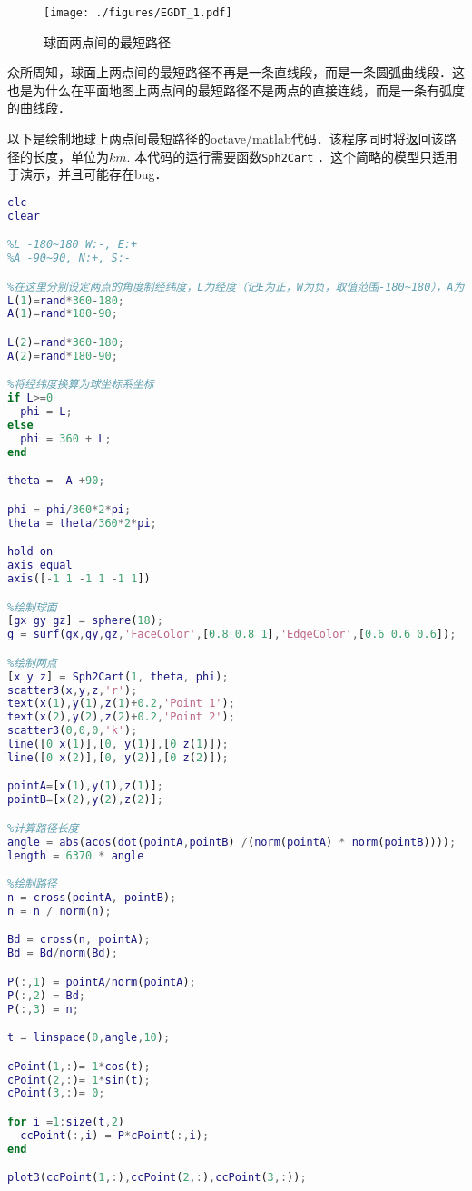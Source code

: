 \begin{figure}[ht]
\centering
\texttt{[image: ./figures/EGDT\_1.pdf]}
\caption{球面两点间的最短路径} \label{EGDT_fig1}
\end{figure}

众所周知，球面上两点间的最短路径不再是一条直线段，而是一条圆弧曲线段．这也是为什么在平面地图上两点间的最短路径不是两点的直接连线，而是一条有弧度的曲线段．

以下是绘制地球上两点间最短路径的octave/matlab代码．该程序同时将返回该路径的长度，单位为$km$. 本代码的运行需要函数\verb|Sph2Cart| ．这个简略的模型只适用于演示，并且可能存在bug．%

\begin{lstlisting}[language=matlab]
clc
clear

%L -180~180 W:-, E:+
%A -90~90, N:+, S:-

%在这里分别设定两点的角度制经纬度，L为经度（记E为正，W为负，取值范围-180~180），A为纬度（记N为正，S为负，取值范围-90~90）．
L(1)=rand*360-180;
A(1)=rand*180-90;

L(2)=rand*360-180;
A(2)=rand*180-90;

%将经纬度换算为球坐标系坐标
if L>=0
  phi = L;
else
  phi = 360 + L;
end

theta = -A +90;

phi = phi/360*2*pi;
theta = theta/360*2*pi;

hold on
axis equal
axis([-1 1 -1 1 -1 1])

%绘制球面
[gx gy gz] = sphere(18);
g = surf(gx,gy,gz,'FaceColor',[0.8 0.8 1],'EdgeColor',[0.6 0.6 0.6]);

%绘制两点
[x y z] = Sph2Cart(1, theta, phi);
scatter3(x,y,z,'r');
text(x(1),y(1),z(1)+0.2,'Point 1');
text(x(2),y(2),z(2)+0.2,'Point 2');
scatter3(0,0,0,'k');
line([0 x(1)],[0, y(1)],[0 z(1)]);
line([0 x(2)],[0, y(2)],[0 z(2)]);

pointA=[x(1),y(1),z(1)];
pointB=[x(2),y(2),z(2)];

%计算路径长度
angle = abs(acos(dot(pointA,pointB) /(norm(pointA) * norm(pointB))));
length = 6370 * angle

%绘制路径
n = cross(pointA, pointB);
n = n / norm(n);

Bd = cross(n, pointA);
Bd = Bd/norm(Bd);

P(:,1) = pointA/norm(pointA);
P(:,2) = Bd;
P(:,3) = n;

t = linspace(0,angle,10);

cPoint(1,:)= 1*cos(t);
cPoint(2,:)= 1*sin(t);
cPoint(3,:)= 0;

for i =1:size(t,2)
  ccPoint(:,i) = P*cPoint(:,i);
end

plot3(ccPoint(1,:),ccPoint(2,:),ccPoint(3,:));

\end{lstlisting}
